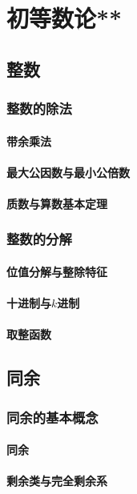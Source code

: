 \part{初等数论**}
\chapter{整数}
\section{整数的除法}
\subsection{带余乘法}
\clearpage
\subsection{最大公因数与最小公倍数}
\clearpage
\subsection{质数与算数基本定理}
\clearpage

\section{整数的分解}
\subsection{位值分解与整除特征}
\clearpage
\subsection{十进制与\texorpdfstring{\(k\)}k进制}
\clearpage
\subsection{取整函数}
\clearpage


\chapter{同余}
\section{同余的基本概念}
\subsection{同余}
\clearpage
\subsection{剩余类与完全剩余系}
\clearpage


